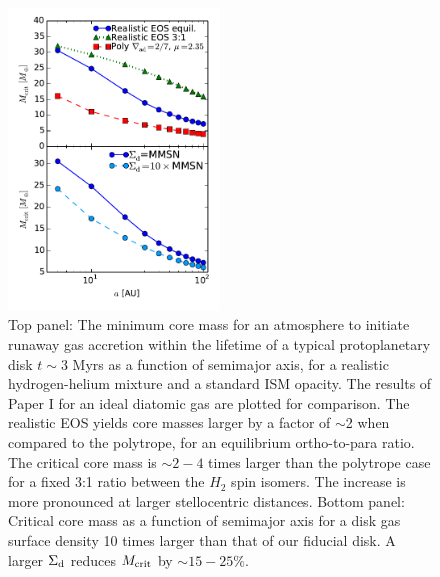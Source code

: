 


\begin{figure}[htb]
\centering
\includegraphics[width=0.5\textwidth]{figures/Mc_vs_a_poly_real_paper.pdf}
\caption{Top panel: The minimum core mass for an atmosphere to initiate runaway gas accretion within the lifetime of a typical protoplanetary disk $t \sim 3$ Myrs as a function of semimajor axis, for a realistic hydrogen-helium mixture and a standard ISM opacity. The results of Paper I for an ideal diatomic gas are plotted for comparison. The realistic EOS yields core masses larger by a factor of $\sim$2 when compared to the polytrope, for an equilibrium ortho-to-para ratio. The critical core mass is $\sim$$2-4$ times larger than the polytrope case for a fixed 3:1 ratio between the $H_2$ spin isomers. The increase is more pronounced at larger stellocentric distances. Bottom panel: Critical core mass as a function of semimajor axis for a disk gas surface density 10 times larger than that of our fiducial disk. A larger $\Sigma_{\rm d}$ reduces $M_{\rm crit}$ by $\sim$$15-25 \%$.}
\label{fig:Mvsaplot}
\end{figure}



